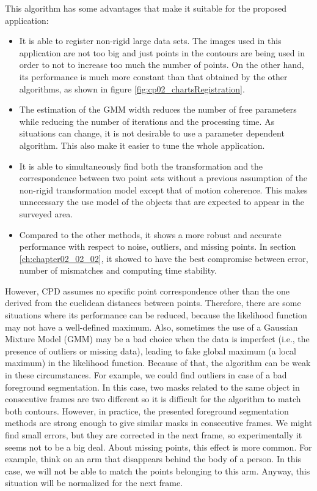 \begin{itemize}
 This algorithm has some advantages that make it suitable for the proposed application:
 \begin{itemize}
  \item It is able to register non-rigid large data sets. The images used in this application are not too big and just 
points in the contours are being used in order to not to increase too much the number of points. On the other hand, its 
performance is much more constant than that obtained by the other algorithms, as shown in figure 
\ref{fig:cp02_chartsRegistration}.
  \item The estimation of the GMM width reduces the number of free parameters while reducing the number of iterations and the processing time. As situations can change, it is not desirable to use a parameter dependent algorithm. This also make it easier to tune the whole application.
  \item It is able to simultaneously find both the transformation and the correspondence between two point sets without a previous assumption of the non-rigid transformation model except that of motion coherence. This makes unnecessary the use model of the objects that are expected to appear in the surveyed area.
  \item Compared to the other methods, it shows a more robust and accurate performance with respect to noise, outliers, 
and missing points. In section \ref{ch:chapter02_02_02}, it showed to have the best compromise between error, 
number of mismatches and computing time stability.
 \end{itemize}
 However, CPD assumes no specific point correspondence other than the one derived from the euclidean distances between 
points. Therefore, there are some situations where its performance can be reduced, because the likelihood function may 
not have a well-defined maximum. Also, sometimes the use of a Gaussian Mixture Model (GMM) may be a bad choice when the 
data is imperfect (i.e., the presence of outliers or missing data), leading to fake global maximum (a local maximum) in the likelihood function. Because of that, the 
algorithm can be weak in these circumstances. For example, we could find outliers in case of a bad foreground segmentation. In this case, two masks related to the same object in consecutive frames are two different so it is difficult for the algorithm to match both contours. However, in practice, the presented foreground segmentation methods are strong enough to give similar masks in consecutive frames. We might find small errors, but they are corrected in the next frame, so experimentally it seems not to be a big deal. About missing points, this effect is more common. For example, think on an arm that disappears behind the body of a person. In this case, we will not be able to match the points belonging to this arm. Anyway, this situation will be normalized for the next frame.


\end{itemize}

